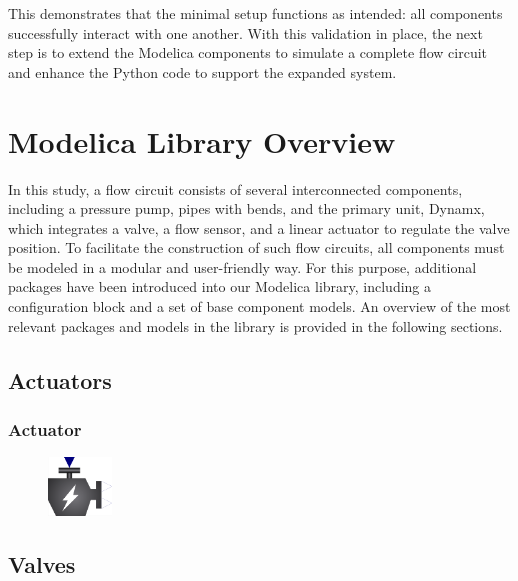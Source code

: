 \documentclass[we,final,11pt,oneside,openany]{uantwerpenbamathesis}
\begin{document}
This demonstrates that the minimal setup functions as intended: all components successfully interact with one another.
With this validation in place, the next step is to extend the Modelica components to simulate a complete flow circuit and enhance the Python code to support the expanded system.

\chapter{Modelica Library Overview}
\label{ch:modelica-library-overview}

In this study, a flow circuit consists of several interconnected components, including a pressure pump, pipes with bends, and the primary unit, Dynamx, which integrates a valve, a flow sensor, and a linear actuator to regulate the valve position.
To facilitate the construction of such flow circuits, all components must be modeled in a modular and user-friendly way.
For this purpose, additional packages have been introduced into our Modelica library, including a configuration block and a set of base component models.
An overview of the most relevant packages and models in the library is provided in the following sections.

\section{Actuators}
\label{sec:actuators}

\subsection{Actuator}
\label{subsec:actuators}

\begin{figure}
    \centering
    \includegraphics[width=0.15\textwidth]{Images/components/actuator}
\end{figure}

\lipsum[67]

\section{Valves}
\label{sec:valves}
\end{document}
